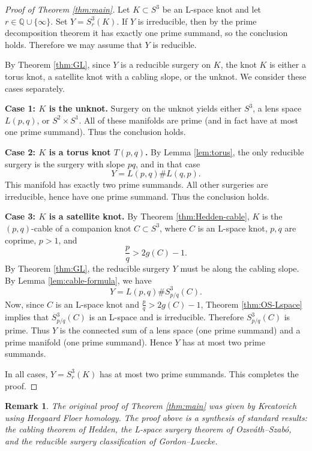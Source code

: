 \documentclass[11pt]{article}
\newtheorem{remark}[theorem]{Remark}
\begin{document}
\begin{proof}[Proof of Theorem \ref{thm:main}]
Let \(K \subset S^3\) be an L-space knot and let \(r \in \mathbb{Q} \cup \{\infty\}\). Set \(Y = S^3_r(K)\). If \(Y\) is irreducible, then by the prime decomposition theorem it has exactly one prime summand, so the conclusion holds. Therefore we may assume that \(Y\) is reducible.

By Theorem \ref{thm:GL}, since \(Y\) is a reducible surgery on \(K\), the knot \(K\) is either a torus knot, a satellite knot with a cabling slope, or the unknot. We consider these cases separately.

\medskip
\noindent\textbf{Case 1: \(K\) is the unknot.}
Surgery on the unknot yields either \(S^3\), a lens space \(L(p,q)\), or \(S^2 \times S^1\). All of these manifolds are prime (and in fact have at most one prime summand). Thus the conclusion holds.

\medskip
\noindent\textbf{Case 2: \(K\) is a torus knot \(T(p,q)\).}
By Lemma \ref{lem:torus}, the only reducible surgery is the surgery with slope \(pq\), and in that case
\[
Y = L(p,q) \# L(q,p).
\]
This manifold has exactly two prime summands. All other surgeries are irreducible, hence have one prime summand. Thus the conclusion holds.

\medskip
\noindent\textbf{Case 3: \(K\) is a satellite knot.}
By Theorem \ref{thm:Hedden-cable}, \(K\) is the \((p,q)\)-cable of a companion knot \(C \subset S^3\), where \(C\) is an L-space knot, \(p,q\) are coprime, \(p>1\), and
\[
\frac{p}{q} > 2g(C)-1.
\]
By Theorem \ref{thm:GL}, the reducible surgery \(Y\) must be along the cabling slope. By Lemma \ref{lem:cable-formula}, we have
\[
Y = L(p,q) \# S^3_{p/q}(C).
\]
Now, since \(C\) is an L-space knot and \(\frac{p}{q} > 2g(C)-1\), Theorem \ref{thm:OS-Lspace} implies that \(S^3_{p/q}(C)\) is an L-space and is irreducible. Therefore \(S^3_{p/q}(C)\) is prime. Thus \(Y\) is the connected sum of a lens space (one prime summand) and a prime manifold (one prime summand). Hence \(Y\) has at most two prime summands.

\medskip
In all cases, \(Y = S^3_r(K)\) has at most two prime summands. This completes the proof.
\end{proof}

\begin{remark}
The original proof of Theorem \ref{thm:main} was given by Krcatovich \cite{Krcatovich2015} using Heegaard Floer homology. The proof above is a synthesis of standard results: the cabling theorem of Hedden, the L-space surgery theorem of Ozsváth--Szabó, and the reducible surgery classification of Gordon--Luecke.
\end{remark}
\end{document}
